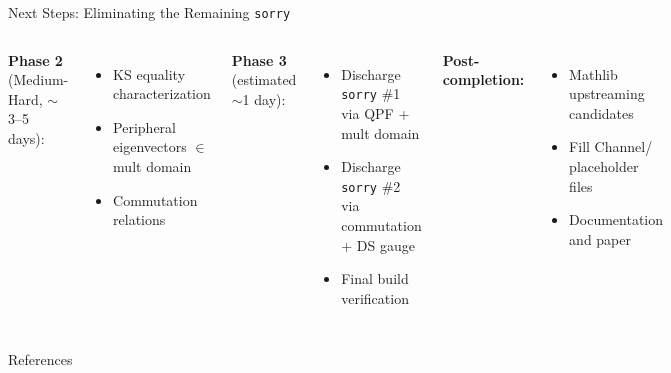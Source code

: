 \documentclass[aspectratio=169,10pt]{beamer}
\begin{document}
\begin{frame}{Next Steps: Eliminating the Remaining \texttt{sorry}}
\begin{columns}[T]
        \vspace{0.2em}
        \textbf{Phase 2} (Medium-Hard, $\sim$3--5 days):
        \begin{itemize}\itemsep0.05em\small
            \item KS equality characterization
            \item Peripheral eigenvectors $\in$ mult domain
            \item Commutation relations
        \end{itemize}

        \textbf{Phase 3} (estimated $\sim$1 day):
        \begin{itemize}\itemsep0.05em\small
            \item Discharge \texttt{sorry} \#1 via QPF + mult domain
            \item Discharge \texttt{sorry} \#2 via commutation + DS gauge
            \item Final build verification
        \end{itemize}

        \vspace{0.2em}
        \textbf{Post-completion:}
        \begin{itemize}\itemsep0.05em\small
            \item[\textcolor{dimwhite}{$\diamond$}] Mathlib upstreaming candidates
            \item[\textcolor{dimwhite}{$\diamond$}] Fill Channel/ placeholder files
            \item[\textcolor{dimwhite}{$\diamond$}] Documentation and paper
        \end{itemize}
    \end{columns}
\end{frame}

\begin{frame}[allowframebreaks]{References}
    \footnotesize
    
\end{frame}
\end{document}
